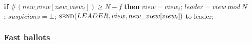 \begin{algorithm}
\begin{algorithmic}[1]
		\State
		\State\hspace{\algorithmicindent} \textbf{if} $\#(new\_view[new\_view_i]) \geq N-f$ \textbf{then}
		\State\hspace{\algorithmicindent}\hspace{\algorithmicindent} $view = view_i$;
		\State\hspace{\algorithmicindent}\hspace{\algorithmicindent} $leader = view\ mod\ N$;
		\State\hspace{\algorithmicindent}\hspace{\algorithmicindent} $suspicions = \bot$;
		\State\hspace{\algorithmicindent}\hspace{\algorithmicindent} $\Call{send}{LEADER, view, new\_view[view_i]}$ to leader;
	\end{algorithmic}
\end{algorithm}

\subsubsection{Fast ballots} 

